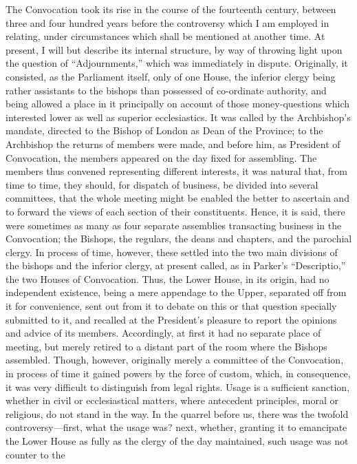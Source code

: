 The Convocation took its rise
in the course of the fourteenth century, between three and four
hundred years before the controversy which I am employed in relating,
under circumstances which shall be mentioned at another time. At
present, I will but describe its internal structure, by way of
throwing light upon the question of ``Adjournments,'' which was
immediately in dispute. Originally, it consisted, as the Parliament
itself, only of one House, the inferior clergy being rather assistants
to the bishops than possessed of co-ordinate authority, and being
allowed a place in it principally on account of those money-questions
which interested lower as well as superior ecclesiastics. It was
called by the Archbishop's mandate, directed to the Bishop of London
as Dean of the Province; to the Archbishop the returns of members were
made, and before him, as President of Convocation, the members
appeared on the day fixed for assembling. The members thus convened
representing different interests, it was natural that, from time
to time, they should, for dispatch of business, be divided into
several committees, that the whole meeting might be enabled the better
to ascertain and to forward the views of each section of their
constituents. Hence, it is said, there were sometimes as many as four
separate assemblies transacting business in the Convocation; the
Bishops, the regulars, the deans and chapters, and the parochial
clergy. In process of time, however, these settled into the two main
divisions of the bishops and the inferior clergy, at present called,
as in Parker's ``Descriptio,'' the two Houses of Convocation. Thus, the
Lower House, in its origin, had no independent existence, being a mere
appendage to the Upper, separated off from it for convenience, sent
out from it to debate on this or that question specially submitted to
it, and recalled at the President's pleasure to report the opinions
and advice of its members. Accordingly, at first it had no separate
place of meeting, but merely retired to a distant part of the room
where the Bishops assembled. Though, however, originally merely a
committee of the Convocation, in process of time it gained powers by
the force of custom, which, in consequence, it was very difficult to
distinguish from legal rights. Usage is a sufficient sanction, whether
in civil or ecclesiastical matters, where antecedent principles, moral
or religious, do not stand in the way. In the quarrel before us, there
was the twofold controversy—first, what the usage was? next,
whether, granting it to emancipate the Lower House as fully as the
clergy of the day maintained, such usage was not counter to the
